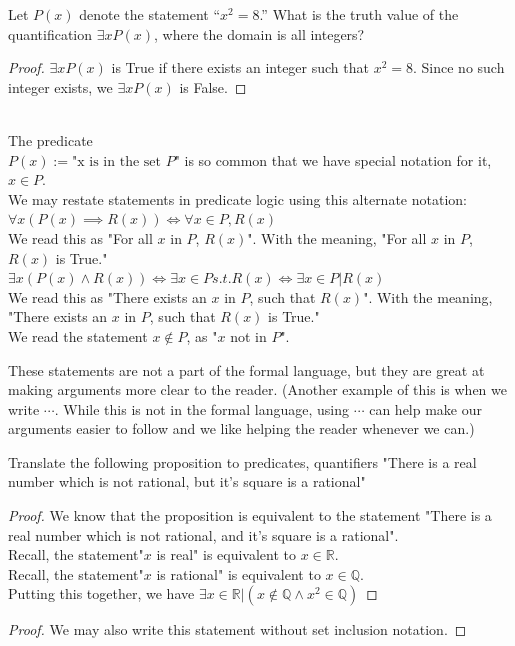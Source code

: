 \begin{exmp}[Existential]
Let $P(x)$ denote the statement “$x^2 = 8 $.” What is the truth value of the quantification $\exists xP(x)$,
where the domain is all integers?
\begin{proof}
$\exists x P(x)$ is True if there exists an integer such that $x^2=8$. Since no such integer exists, we $\exists x P(x)$ is False.
\end{proof}
\end{exmp}
\begin{defn} \ \\
The predicate
\\
$P(x):= \text{"x is in the set $P$"}$ is so common that we have special notation for it, $x \in P$.
\\
We may restate statements in predicate logic using this alternate notation:
\\
$\forall x (P(x) \implies R(x))\iff \forall x \in P, R(x)$
\\
We read this as "For all $x$ in $P$, $R(x)$". With the meaning, "For all $x$ in $P$, $R(x)$ is True."
\\
$\exists x (P(x) \land  R(x))\iff \exists x \in P s.t. R(x)\iff \exists x \in P | R(x)$
\\
We read this as "There exists an $x$ in $P$, such that $R(x)$". With the meaning, "There exists an $x$ in $P$, such that $R(x)$ is True."
\\
We read the statement $x\notin P$, as "$x$ not in $P$".
\end{defn}
\begin{rem}
These statements are not a part of the formal language, but they are great at making arguments  more clear to the reader. (Another example of this is when we write $\cdots$. While this is not in the formal language, using $\cdots$ can help make our arguments easier to follow and we like helping the reader whenever we can.)
\end{rem}
\begin{exmp}[translation]
Translate the following proposition to predicates, quantifiers
"There is a real number which is not rational, but it's square is a rational"

\begin{proof}
We know that the proposition is equivalent to the statement "There is a real number which is not rational, and it's square is a rational".
\\
Recall, the statement"$x$ is real" is equivalent to $x \in \mathbb{R}$.
\\
Recall, the statement"$x$ is rational" is equivalent to $x \in \mathbb{Q}$.
\\
Putting this together, we have
$\exists x \in \mathbb{R} |( x \notin \mathbb{Q} \land x^2 \in \mathbb{Q} )$
\end{proof}
\begin{proof}
We may also write this statement without set inclusion notation.



\end{proof}



\end{exmp}

